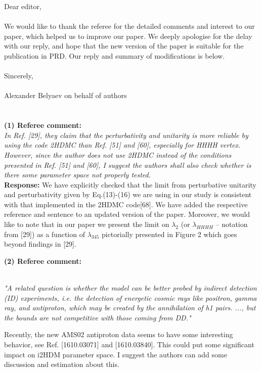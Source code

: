 \documentclass[11pt]{article}
\begin{document}
\noindent 
Dear editor, 
\\
\\
We would like to thank the referee for the detailed comments and interest to our paper,
which helped us to improve our paper.
We deeply apologise for the delay with our reply,
and hope that the new version of the paper is suitable for the publication in PRD.
Our reply and summary of modifications is below.
\\
\\
\noindent Sincerely, 
\\
\\
\noindent 
Alexander Belyaev on behalf of authors
\\
\\
\\
{\bf (1) Referee comment:} { \it \\
In Ref. [29], they claim that the perturbativity and unitarity is
more reliable by using the code 2HDMC than Ref. [51] and [60],
especially for HHHH vertex. However, since the author does not use
2HDMC instead of the conditions presented in Ref. [51] and [60], I
suggest the authors shall also check whether is there some parameter
space not properly tested.
}\\

{\bf Response:} 
We have explicitly checked that the limit
from perturbative unitarity and perturbativity given by Eq.(13)-(16) we are using in our study is
consistent with that implemented in the 2HDMC code[68].
We have added the respective reference and sentence to an updated version of the paper.
Moreover, we would like to note that in our paper we present the limit on $\lambda_2$ (or $\lambda_{HHHH}$  -- notation from [29])
as a function of $\lambda_{345}$ pictorially presented in Figure 2 which goes beyond findings in [29].

\bigskip

\noindent
{\bf (2) Referee comment:} {\it  \\
"A related question is whether the model can be better probed by
indirect detection (ID) experiments, i.e. the detection of energetic
cosmic rays like positron, gamma ray, and antiproton, which may be
created by the annihilation of h1 pairs. ..., but the bounds are not
competitive with those coming from DD."

Recently, the new AMS02 antiproton data seems to have some interesting
behavior, see Ref. [1610.03071] and [1610.03840]. This could put some
significant impact on i2HDM parameter space. I suggest the authors can
add some discussion and estimation about this.
}
\end{document}
